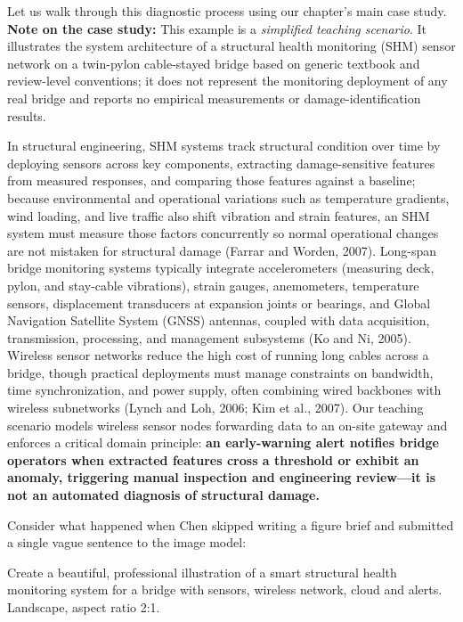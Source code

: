 Let us walk through this diagnostic process using our chapter's main case study. \textbf{Note on the case study:} This example is a \emph{simplified teaching scenario}. It illustrates the system architecture of a structural health monitoring (SHM) sensor network on a twin-pylon cable-stayed bridge based on generic textbook and review-level conventions; it does not represent the monitoring deployment of any real bridge and reports no empirical measurements or damage-identification results.

In structural engineering, SHM systems track structural condition over time by deploying sensors across key components, extracting damage-sensitive features from measured responses, and comparing those features against a baseline; because environmental and operational variations such as temperature gradients, wind loading, and live traffic also shift vibration and strain features, an SHM system must measure those factors concurrently so normal operational changes are not mistaken for structural damage (Farrar and Worden, 2007). Long-span bridge monitoring systems typically integrate accelerometers (measuring deck, pylon, and stay-cable vibrations), strain gauges, anemometers, temperature sensors, displacement transducers at expansion joints or bearings, and Global Navigation Satellite System (GNSS) antennas, coupled with data acquisition, transmission, processing, and management subsystems (Ko and Ni, 2005). Wireless sensor networks reduce the high cost of running long cables across a bridge, though practical deployments must manage constraints on bandwidth, time synchronization, and power supply, often combining wired backbones with wireless subnetworks (Lynch and Loh, 2006; Kim et al., 2007). Our teaching scenario models wireless sensor nodes forwarding data to an on-site gateway and enforces a critical domain principle: \textbf{an early-warning alert notifies bridge operators when extracted features cross a threshold or exhibit an anomaly, triggering manual inspection and engineering review---it is not an automated diagnosis of structural damage.}

Consider what happened when Chen skipped writing a figure brief and submitted a single vague sentence to the image model:

\begin{Prompt}
Create a beautiful, professional illustration of a smart structural health
monitoring system for a bridge with sensors, wireless network, cloud and alerts.
Landscape, aspect ratio 2:1.
\end{Prompt}


